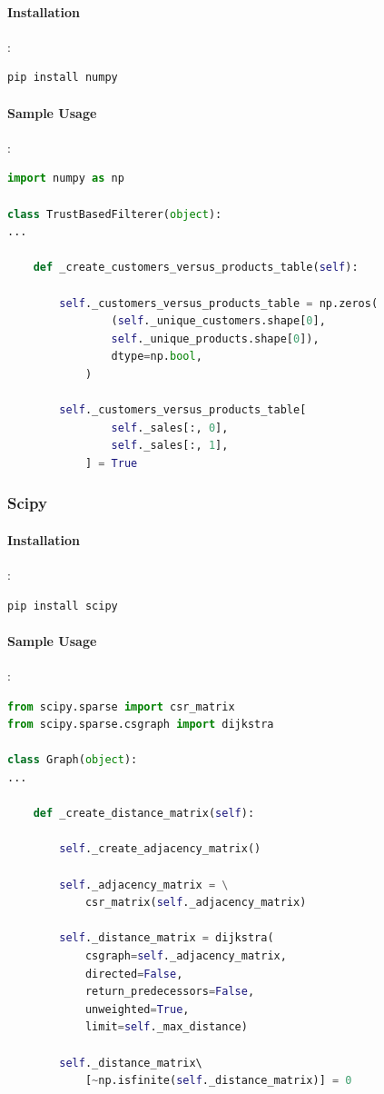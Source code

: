 \documentclass[12pt]{article}
\begin{document}
\paragraph{Installation}:
\begin{lstlisting}[language=bash]
pip install numpy
\end{lstlisting}

\paragraph{Sample Usage}:
\begin{lstlisting}[language=python, caption=Numpy example]
import numpy as np

class TrustBasedFilterer(object):
...

	def _create_customers_versus_products_table(self):

		self._customers_versus_products_table = np.zeros(
				(self._unique_customers.shape[0],
				self._unique_products.shape[0]),
				dtype=np.bool,
			)
			
		self._customers_versus_products_table[
				self._sales[:, 0],
				self._sales[:, 1],
			] = True
\end{lstlisting}

\subsubsection{Scipy}
\paragraph{Installation}:
\begin{lstlisting}[language=bash]
pip install scipy
\end{lstlisting}

\paragraph{Sample Usage}:
\begin{lstlisting}[language=python, caption=Scipy example]
from scipy.sparse import csr_matrix
from scipy.sparse.csgraph import dijkstra

class Graph(object):
...

	def _create_distance_matrix(self):

		self._create_adjacency_matrix()

		self._adjacency_matrix = \
			csr_matrix(self._adjacency_matrix)
		
		self._distance_matrix = dijkstra( 
			csgraph=self._adjacency_matrix, 
			directed=False, 
			return_predecessors=False, 
			unweighted=True,
			limit=self._max_distance)

		self._distance_matrix\ 
			[~np.isfinite(self._distance_matrix)] = 0
\end{lstlisting}
\end{document}
